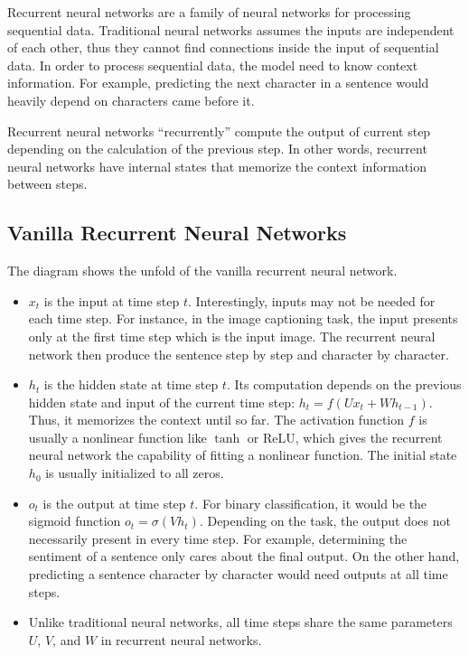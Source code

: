     Recurrent neural networks are a family of neural networks for processing sequential data.
    Traditional neural networks assumes the inputs are independent of each other,
    thus they cannot find connections inside the input of sequential data.
    In order to process sequential data, the model need to know context information.
    For example, predicting the next character in a sentence would heavily depend on
    characters came before it.

    Recurrent neural networks ``recurrently'' compute the output of current step
    depending on the calculation of the previous step.
    In other words, recurrent neural networks have internal states
    that memorize the context information between steps.

    \subsection{Vanilla Recurrent Neural Networks}


        The diagram shows the unfold of the vanilla recurrent neural network.

        \begin{itemize}
            \item $x_t$ is the input at time step $t$.
                Interestingly, inputs may not be needed for each time step.
                For instance, in the image captioning task,
                the input presents only at the first time step which is the input image.
                The recurrent neural network then produce the sentence step by step and character by character.
            \item $h_t$ is the hidden state at time step $t$.
                Its computation depends on the previous hidden state and input of the current time step:
                $h_t = f(Ux_t + Wh_{t-1})$.
                Thus, it memorizes the context until so far.
                The activation function $f$ is usually a nonlinear function like $\tanh$ or $\mathrm{ReLU}$,
                which gives the recurrent neural network the capability of fitting a nonlinear function.
                The initial state $h_0$ is usually initialized to all zeros.
            \item $o_t$ is the output at time step $t$.
                For binary classification, it would be the sigmoid function $o_t = \sigma(Vh_t)$.
                Depending on the task, the output does not necessarily present in every time step.
                For example, determining the sentiment of a sentence only cares about the final output.
                On the other hand, predicting a sentence character by character would need outputs at all time steps.
            \item Unlike traditional neural networks,
                all time steps share the same parameters $U$, $V$, and $W$ in recurrent neural networks.
        \end{itemize}

